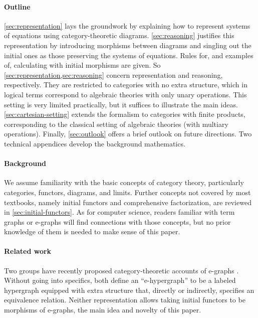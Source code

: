 \documentclass[11pt]{article}
\numberwithin{equation}{section}
\begin{document}
\paragraph{Outline}

\cref{sec:representation} lays the groundwork by explaining how to represent
systems of equations using category-theoretic diagrams. \cref{sec:reasoning}
justifies this representation by introducing morphisms between diagrams and
singling out the initial ones as those preserving the systems of equations.
Rules for, and examples of, calculating with initial morphisms are given. So
\cref{sec:representation,sec:reasoning} concern representation and reasoning,
respectively. They are restricted to categories with no extra structure, which
in logical terms correspond to algebraic theories with only unary operations.
This setting is very limited practically, but it suffices to illustrate the main
ideas. \cref{sec:cartesian-setting} extends the formalism to categories with
finite products, corresponding to the classical setting of algebraic theories
(with multiary operations). Finally, \cref{sec:outlook} offers a brief outlook
on future directions. Two technical appendices develop the background
mathematics.

\paragraph{Background}

We assume familiarity with the basic concepts of category theory, particularly
categories, functors, diagrams, and limits. Further concepts not covered by most
textbooks, namely initial functors and comprehensive factorization, are reviewed
in \cref{sec:initial-functors}. As for computer science, readers familiar with
term graphs or e-graphs will find connections with those concepts, but no prior
knowledge of them is needed to make sense of this paper.

\paragraph{Related work}

Two groups have recently proposed category-theoretic accounts of e-graphs
\cite{biondo2025,tiurin2025}. Without going into specifics, both define an
``e-hypergraph'' to be a labeled hypergraph equipped with extra structure that,
directly or indirectly, specifies an equivalence relation. Neither
representation allows taking initial functors to be morphisms of e-graphs,
the main idea and novelty of this paper.
\end{document}
